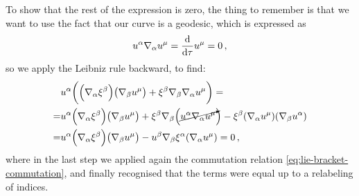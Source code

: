 \documentclass[main.tex]{subfiles}
\begin{document}
To show that the rest of the expression is zero, the thing to remember is that we want to use the fact that our curve is a geodesic, which is expressed as 
%
\begin{align}
  u^{\alpha } \nabla_{\alpha } u^{\mu } = \dv{}{\tau } u^{\mu } = 0 
\,,
\end{align}
%
so we apply the Leibniz rule backward, to find: 
%
\begin{align}
  & u^{\alpha } \qty( \qty(\nabla_{\alpha } \xi^{\beta }) \qty(\nabla_{\beta } u^{\mu })  
  + \xi^{\beta } \nabla_{\beta }\nabla_{\alpha } u^{\mu } )= \\
  =& u^{\alpha } \qty(\nabla_{\alpha } \xi^{\beta }) \qty(\nabla_{\beta } u^{\mu }) 
  + \xi^{\beta } \nabla_{ \beta } \qty( \cancelto{}{u^{\alpha } \nabla_{\alpha } u^{\mu }}) 
  - \xi^{\beta } \qty(\nabla_{\alpha } u^{\mu } ) (\nabla_{\beta } u^{\alpha })  \\
  =& u^{\alpha } \qty(\nabla_{\alpha } \xi^{\beta }) \qty(\nabla_{\beta } u^{\mu }) 
  - u^{\beta } \nabla_{\beta }\xi^{\alpha } ( \nabla_{\alpha } u^{\mu }) = 0
\,,
\end{align}
%
where in the last step we applied again the commutation relation \eqref{eq:lie-bracket-commutation}, and finally recognised that the terms were equal up to a relabeling of indices. 
\end{document}
